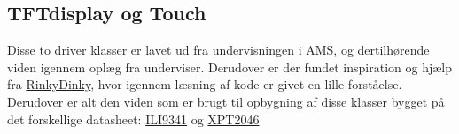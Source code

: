 \subsection{TFTdisplay og Touch}
Disse to driver klasser er lavet ud fra undervisningen i AMS, og dertilhørende viden igennem oplæg fra underviser. Derudover er der fundet inspiration og hjælp fra \href{http://www.rinkydinkelectronics.com/library.php}{RinkyDinky}, hvor igennem læsning af kode er givet en lille forståelse. Derudover er alt den viden som er brugt til opbygning af disse klasser bygget på det forskellige datasheet: \href{https://blackboard.au.dk/bbcswebdav/pid-1697983-dt-content-rid-3847230_1/courses/BB-Cou-UUVA-73302/BB-Cou-UUVA-65758_ImportedContent_20170106021228/BB-Cou-STADS-UUVA-52360_ImportedContent_20160107025559/LAB/Lab3a%20Graphic%20LCD%20Display/Files%20for%20LAB3a/ILI9341_v1.11.pdf}{ILI9341} 
og 
\href{https://blackboard.au.dk/bbcswebdav/pid-1762166-dt-content-rid-4251461_1/courses/BB-Cou-UUVA-73302/BB-Cou-UUVA-65758_ImportedContent_20170106021228/BB-Cou-STADS-UUVA-52360_ImportedContent_20160107025559/LAB/LAB10%20Touch%20Screen%20Driver/Files%20for%20LAB10/XPT2046.pdf}{XPT2046}